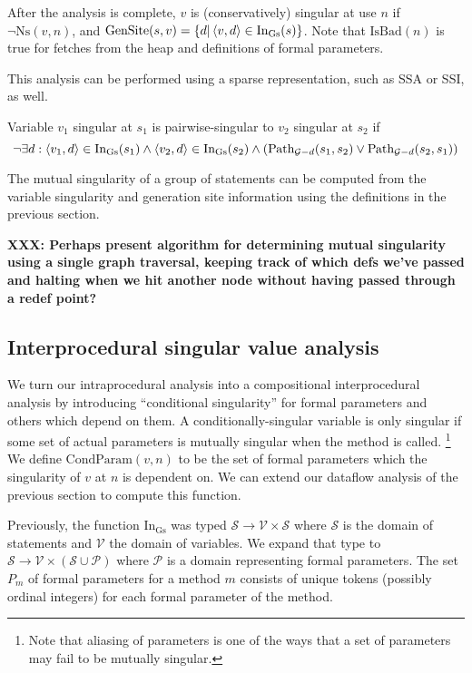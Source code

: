 \documentclass[11pt,notitlepage]{article}
\begin{document}
After the analysis is complete, $v$ is (conservatively) singular at
use $n$ if $\neg\text{Ns}(v,n)$, and 
$\text{GenSite}(s,v)=\left\{ d | \left\langle v,d \right\rangle\in\text{In}_\text{Gs}(s) \right\}$.
Note that $\text{IsBad}(n)$ is true for fetches from the heap and
definitions of formal parameters.

This analysis can be performed using a sparse representation, such as
SSA or SSI, as well.

Variable $v_1$ singular at $s_1$ is pairwise-singular to $v_2$
singular at $s_2$ if
\begin{displaymath}
\neg\exists 
     d : \left\langle v_1, d \right\rangle \in \text{In}_\text{Gs}(s_1) \wedge
         \left\langle v_2, d \right\rangle \in \text{In}_\text{Gs}(s_2) \wedge
\left(\text{Path}_{\mathcal{G}-d}(s_1, s_2) \vee
      \text{Path}_{\mathcal{G}-d}(s_2, s_1) \right)
\end{displaymath}

The mutual singularity of a group of statements can be computed from
the variable singularity and generation site information using the
definitions in the previous section.

\textbf{XXX: Perhaps present algorithm for determining mutual
singularity using a single graph traversal, keeping track of which
defs we've passed and halting when we hit another node without
having passed through a redef point?}

\subsection{Interprocedural singular value analysis}

We turn our intraprocedural analysis into a compositional
interprocedural analysis by introducing ``conditional singularity''
for formal parameters and others which depend on them.  A
conditionally-singular variable is only singular if some set of actual
parameters is mutually singular when the method is called.%
\footnote{Note that aliasing of parameters is one of the ways that
a set of parameters may fail to be mutually singular.}
We define
$\text{CondParam}(v,n)$ to be the set of formal parameters which the
singularity of $v$ at $n$ is dependent on.  We can extend our dataflow
analysis of the previous section to compute this function.


Previously, the function $\text{In}_\text{Gs}$ was typed
$\mathcal{S\to V\times S}$
where $\mathcal{S}$ is the domain of statements
and $\mathcal{V}$ the domain of variables.
We expand that type to
$\mathcal{S\to V\times (S\cup P)}$ where $\mathcal{P}$ is a domain
representing formal parameters.  The set $P_m$ of formal parameters for
a method $m$ consists of unique tokens (possibly ordinal integers) for
each formal parameter of the method.
\end{document}
